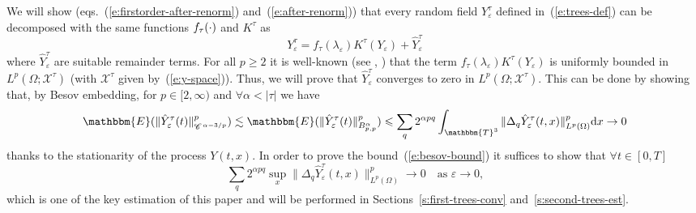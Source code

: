 We will show (eqs.~(\ref{e:firstorder-after-renorm})
and~(\ref{e:after-renorm})) that every random field $Y^{\tau}_{\varepsilon}$
defined in~(\ref{e:trees-def}) can be decomposed with the same functions
$f_{\tau} (\cdot)$ and $K^{\tau}$ as
\begin{equation}
  Y^{\tau}_{\varepsilon} = f_{\tau} (\lambda_{\varepsilon}) K^{\tau}
  (Y_{\varepsilon}) + \hat{Y}^{\tau}_{\varepsilon}  \label{eq:decomp-chaos}
\end{equation}
where $\hat{Y}^{\tau}_{\varepsilon}$ are suitable remainder terms. For all $p
\geqslant 2$ it is well-known (see {\cite{catellier_paracontrolled_2013}},
{\cite{hairer_theory_2014}}) that the term $f_{\tau} (\lambda_{\varepsilon})
K^{\tau} (Y_{\varepsilon})$ is uniformly bounded in $L^p (\Omega ;
\mathcal{X}^{\tau})$ (with $\mathcal{X}^{\tau}$ given by~(\ref{e:y-space})).
Thus, we will prove that $\hat{Y}^{\tau}_{\varepsilon}$ converges to zero in
$L^p (\Omega ; \mathcal{X}^{\tau})$. This can be done by showing that, by
Besov embedding, for $p \in [2, \infty)$ and $\forall \alpha < | \tau |$ we
have
\begin{equation}
  \mathbbm{E} (\| \hat{Y}^{\tau}_{\varepsilon} (t) \|_{\CC^{\alpha - 3 /
  p}}^p) \lesssim \mathbbm{E} (\| \hat{Y}_{\varepsilon}^{\tau} (t)
  \|^p_{B^{\alpha}_{p, p}}) \leqslant \sum_q 2^{\alpha pq}
  \int_{\mathbbm{T}^3}  \| \Delta_q \hat{Y}_{\varepsilon}^{\tau} (t, x)
  \|^p_{L^p (\Omega)} \mathd x \rightarrow 0 \label{e:besov-bound}
\end{equation}
thanks to the stationarity of the process $Y (t, x)$. In order to prove the
bound~(\ref{e:besov-bound}) it suffices to show that $\forall t \in [0, T]$
\begin{equation}
  \sum_q 2^{\alpha pq} \sup_x  \| \Delta_q \hat{Y}_{\varepsilon}^{\tau} (t, x)
  \|^p_{L^p (\Omega)} \rightarrow 0 \quad \text{as $\varepsilon \rightarrow
  0$,}  \label{e:check-conv-1}
\end{equation}
which is one of the key estimation of this paper and will be performed in
Sections~\ref{s:first-trees-conv} and~\ref{s:second-trees-est}.


